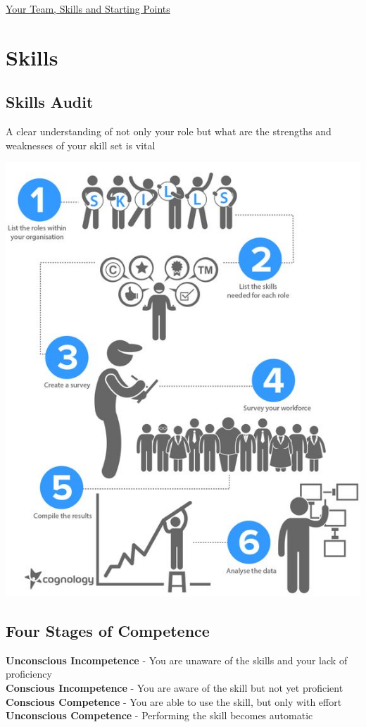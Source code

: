 \documentclass{article}[18pt]
\begin{document}
\begin{center}
\underline{\huge Your Team, Skills and Starting Points}
\end{center}
\section{Skills}
\subsection{Skills Audit}
A clear understanding of not only your role but what are the strengths and weaknesses of your skill set is vital
\begin{center}
	\includegraphics[scale=0.7]{Audit}
\end{center}
\subsection{Four Stages of Competence}
\textbf{Unconscious Incompetence} - You are unaware of the skills and your lack of proficiency\\
\textbf{Conscious Incompetence} - You are aware of the skill but not yet proficient\\
\textbf{Conscious Competence} - You are able to use the skill, but only with effort\\
\textbf{Unconscious Competence} - Performing the skill becomes automatic
\end{document}
